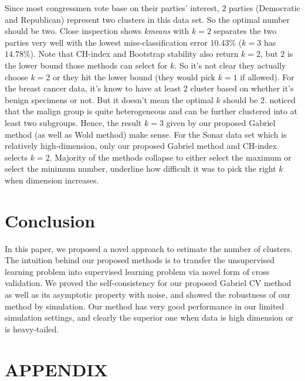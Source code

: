 \documentclass[11pt]{article}
\begin{document}
Since most congressmen vote base on their parties' interest, $2$ parties
(Democratic and Republican) represent two clusters in this data set. So the
optimal number should be two. Close inspection shows \textit{kmeans} with
$k=2$ separates the two parties very well with the lowest miss-classification
error $10.43\%$ ($k=3$ has $14.78\%$). Note that CH-index and Bootstrap
stability also return $k=2$, but $2$ is the lower bound those methods can
select for $k$. So it's not clear they actually choose $k=2$ or they hit the
lower bound (they would pick $k=1$ if allowed). For the breast cancer data,
it's know to have at least $2$ cluster based on whether it's benign specimens
or not. But it doesn't mean the optimal $k$ should be $2$.
\cite{fujita2014non} noticed that the malign group is quite heterogeneous and
can be further clustered into at least two subgroups. Hence, the result $k=3$
given by our proposed Gabriel method (as well as Wold method) make sense. For
the Sonar data set which is relatively high-dimension, only our proposed
Gabriel method and CH-index selects $k=2$. Majority of the methods collapse to
either select the maximum or select the minimum number, underline how
difficult it was to pick the right $k$ when dimension increases. 


\section{Conclusion}

In this paper, we proposed a novel approach to estimate the number of
clusters. The intuition behind our proposed methods is to transfer the
unsupervised learning problem into supervised learning problem via novel form
of cross validation. We proved the self-consistency for our proposed Gabriel
CV method as well as its asymptotic property with noise, and showed the
robustness of our method by simulation. Our method has very good performance
in our limited simulation settings, and clearly the superior one when data is
high dimension or is heavy-tailed.


\section*{\textbf{APPENDIX}}
\appendix
\end{document}

